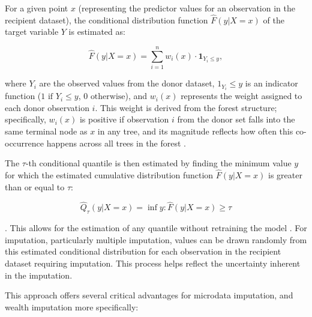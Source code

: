 For a given point $x$ (representing the predictor values for an observation in the recipient dataset), the conditional distribution function $\hat{F}(y|X=x)$ of the target variable $Y$ is estimated as:

$$\hat{F}(y|X=x) = \sum_{i=1}^n w_i(x) \cdot \mathbf{1}_{{Y_i \leq y}},$$

where $Y_i$ are the observed values from the donor dataset, $1_{Y_i} \leq y$ is an indicator function ($1 \text{ if } Y_i \leq y$, $0 \text{ otherwise}$), and $w_i(x)$ represents the weight assigned to each donor observation $i$. This weight is derived from the forest structure; specifically, $w_i(x)$ is positive if observation $i$ from the donor set falls into the same terminal node as $x$ in any tree, and its magnitude reflects how often this co-occurrence happens across all trees in the forest \citep{kleinke2023robust}.

The $\tau$-th conditional quantile is then estimated by finding the minimum value $y$ for which the estimated cumulative distribution function $\hat{F}(y|X=x)$ is greater than or equal to $\tau$:

$$\hat{Q}_\tau(y|X=x) = \inf{y: \hat{F}(y|X=x) \geq \tau}$$

\citep{meinshausen2006quantile}. This allows for the estimation of any quantile without retraining the model \citep{woodruff2024enhancing}. For imputation, particularly multiple imputation, values can be drawn randomly from this estimated conditional distribution for each observation in the recipient dataset requiring imputation. This process helps reflect the uncertainty inherent in the imputation.

This approach offers several critical advantages for microdata imputation, and wealth imputation more specifically:


